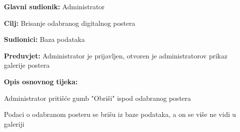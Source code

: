 					\noindent {}
					\begin{packed_item}
						
						\item \textbf{Glavni sudionik: } Administrator
						\item  \textbf{Cilj:} Brisanje odabranog digitalnog postera
						\item  \textbf{Sudionici:} Baza podataka
						\item  \textbf{Preduvjet:} Administrator je prijavljen, otvoren je administratorov prikaz galerije postera
						\item  \textbf{Opis osnovnog tijeka:}
						
						\item[] \begin{packed_enum}
							
							\item Administrator pritišće gumb "Obriši" ispod odabranog postera
							\item Podaci o odabranom posteru se brišu iz baze podataka, a on se više ne vidi u galeriji
							
						\end{packed_enum}
					\end{packed_item}
					
